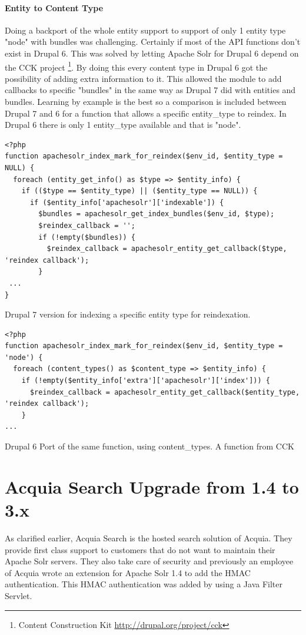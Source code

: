 \paragraph{Entity to Content Type}
Doing a backport of the whole entity support to support of only 1 entity type "node" with bundles was challenging. Certainly if most of the API functions don't exist in Drupal 6. This was solved by letting Apache Solr for Drupal 6 depend on the CCK project \footnote{Content Construction Kit \url{http://drupal.org/project/cck}}. By doing this every content type in Drupal 6 got the possibility of adding extra information to it. This allowed the module to add callbacks to specific "bundles" in the same way as Drupal 7 did with entities and bundles. Learning by example is the best so a comparison is included between Drupal 7 and 6 for a function that allows a specific entity\_type to reindex. In Drupal 6 there is only 1 entity\_type available and that is "node".

\begin{verbatim}
<?php
function apachesolr_index_mark_for_reindex($env_id, $entity_type = NULL) {
  foreach (entity_get_info() as $type => $entity_info) {
    if (($type == $entity_type) || ($entity_type == NULL)) {
      if ($entity_info['apachesolr']['indexable']) {
        $bundles = apachesolr_get_index_bundles($env_id, $type);
        $reindex_callback = '';
        if (!empty($bundles)) {
          $reindex_callback = apachesolr_entity_get_callback($type, 'reindex callback');
        }
 ...
}\end{verbatim}
\caption{Drupal 7 version for indexing a specific entity type for reindexation.}

\begin{verbatim}
<?php
function apachesolr_index_mark_for_reindex($env_id, $entity_type = 'node') {
  foreach (content_types() as $content_type => $entity_info) {
    if (!empty($entity_info['extra']['apachesolr']['index'])) {
      $reindex_callback = apachesolr_entity_get_callback($entity_type, 'reindex callback');
    }
...
\end{verbatim}
\caption{Drupal 6 Port of the same function, using content\_types. A function from CCK}

\section{Acquia Search Upgrade from 1.4 to 3.x}
As clarified earlier, Acquia Search is the hosted search solution of Acquia. They provide first class support to customers that do not want to maintain their Apache Solr servers. They also take care of security and previously an employee of Acquia wrote an extension for Apache Solr 1.4 to add the HMAC authentication. This HMAC authentication was added by using a Java Filter Servlet. 
